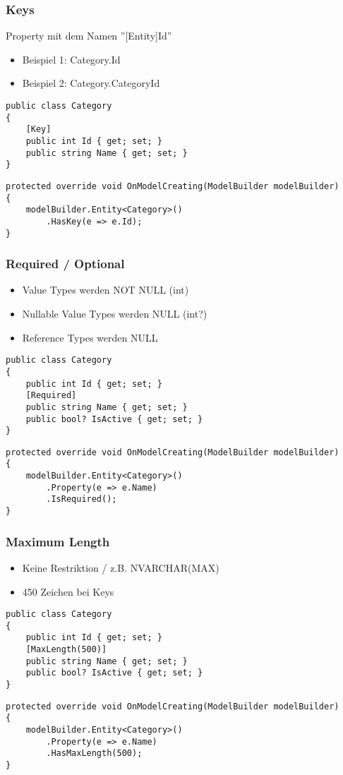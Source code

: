 \begin{multicols*}{2}
\subsubsection{Keys}
Property mit dem Namen ''[Entity]Id''
\begin{itemize}
    \item Beispiel 1: Category.Id
    \item Beispiel 2: Category.CategoryId
\end{itemize}
\begin{lstlisting}
public class Category
{
    [Key]
    public int Id { get; set; } 
    public string Name { get; set; }
}
\end{lstlisting}
\begin{lstlisting}
protected override void OnModelCreating(ModelBuilder modelBuilder)
{
    modelBuilder.Entity<Category>()
        .HasKey(e => e.Id);
}
\end{lstlisting}
\subsubsection{Required / Optional}
\begin{itemize}
    \item Value Types werden NOT NULL (int)
    \item Nullable Value Types werden NULL (int?)
    \item Reference Types werden NULL
\end{itemize}
\begin{lstlisting}
public class Category
{
    public int Id { get; set; } 
    [Required]
    public string Name { get; set; } 
    public bool? IsActive { get; set; }
}
\end{lstlisting}
\begin{lstlisting}
protected override void OnModelCreating(ModelBuilder modelBuilder)
{
    modelBuilder.Entity<Category>()
        .Property(e => e.Name)
        .IsRequired();
}
\end{lstlisting}
\subsubsection{Maximum Length}
\begin{itemize}
    \item Keine Restriktion / z.B. NVARCHAR(MAX)
    \item 450 Zeichen bei Keys
\end{itemize}
\begin{lstlisting}
public class Category
{
    public int Id { get; set; } 
    [MaxLength(500)]
    public string Name { get; set; } 
    public bool? IsActive { get; set; }
}
\end{lstlisting}
\begin{lstlisting}
protected override void OnModelCreating(ModelBuilder modelBuilder)
{
    modelBuilder.Entity<Category>()
        .Property(e => e.Name)
        .HasMaxLength(500);
}
\end{lstlisting}

\end{multicols*}

